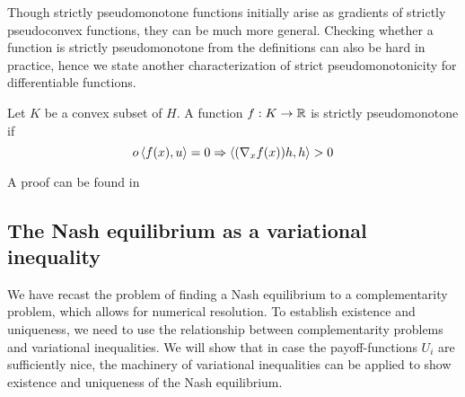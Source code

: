 Though strictly pseudomonotone functions initially arise as gradients of strictly pseudoconvex functions, they can be much more general. Checking whether a function is strictly pseudomonotone from the definitions can also be hard in practice, hence we state another characterization of strict pseudomonotonicity for differentiable functions.
  \begin{lemma}
  \label{lem:strict_pm}
  Let $K$ be a convex subset of $H$. A function $f: K \to \mathbb{R}$ is strictly pseudomonotone if
  \begin{equation}o
    \left \langle f(x),u \right \rangle = 0 \Rightarrow \left \langle (\nabla_x f(x))h,h \right \rangle > 0
  \end{equation}
\end{lemma}
A proof can be found in \citep[Proposition 2.8, p.96]{hadjisavvas2006handbook}


\subsection{The Nash equilibrium as a variational inequality}
We have recast the problem of finding a Nash equilibrium to a complementarity problem, which allows for numerical resolution. To establish existence and uniqueness, we need to use the relationship between complementarity problems and variational inequalities. We will show that in case the payoff-functions $U_i $ are sufficiently nice, the machinery of variational inequalities can be applied to show existence and uniqueness of the Nash equilibrium.

